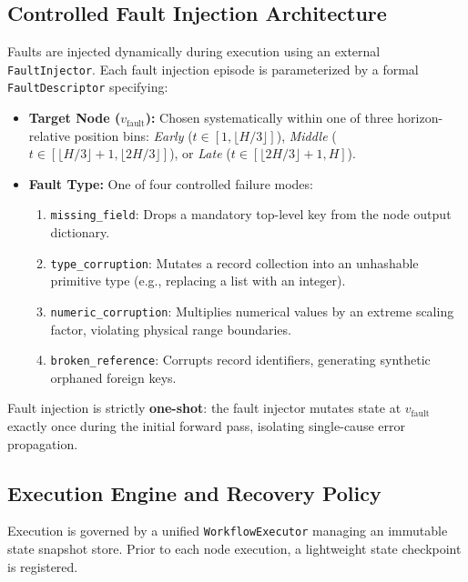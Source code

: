 \subsection{Controlled Fault Injection Architecture}
Faults are injected dynamically during execution using an external \texttt{FaultInjector}. Each fault injection episode is parameterized by a formal \texttt{FaultDescriptor} specifying:
\begin{itemize}
    \item \textbf{Target Node ($v_{\text{fault}}$):} Chosen systematically within one of three horizon-relative position bins: \emph{Early} ($t \in [1, \lfloor H/3 \rfloor]$), \emph{Middle} ($t \in [\lfloor H/3 \rfloor + 1, \lfloor 2H/3 \rfloor]$), or \emph{Late} ($t \in [\lfloor 2H/3 \rfloor + 1, H]$).
    \item \textbf{Fault Type:} One of four controlled failure modes:
    \begin{enumerate}
        \item \texttt{missing\_field}: Drops a mandatory top-level key from the node output dictionary.
        \item \texttt{type\_corruption}: Mutates a record collection into an unhashable primitive type (e.g., replacing a list with an integer).
        \item \texttt{numeric\_corruption}: Multiplies numerical values by an extreme scaling factor, violating physical range boundaries.
        \item \texttt{broken\_reference}: Corrupts record identifiers, generating synthetic orphaned foreign keys.
    \end{enumerate}
\end{itemize}
Fault injection is strictly \textbf{one-shot}: the fault injector mutates state at $v_{\text{fault}}$ exactly once during the initial forward pass, isolating single-cause error propagation.

\subsection{Execution Engine and Recovery Policy}
Execution is governed by a unified \texttt{WorkflowExecutor} managing an immutable state snapshot store. Prior to each node execution, a lightweight state checkpoint is registered. 


